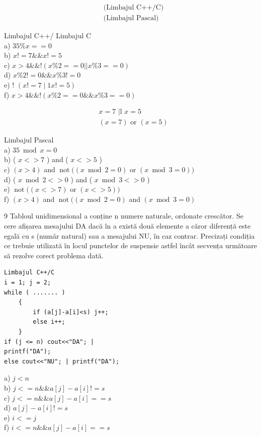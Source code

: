 \documentclass[10pt]{article}
\begin{document}
$$
\begin{aligned}
& \text { (Limbajul C++/C) } \\
& \text { (Limbajul Pascal) }
\end{aligned}
$$

Limbajul C++/ Limbajul C\\
a) $35 \% x==0$\\
b) $x!=7 \& \& x!=5$\\
c) $x>4 \& \&!(x \% 2==0| | x \% 3==0)$\\
d) $x \% 2!=0 \& \& x \% 3!=0$\\
e) ! $(x!=7 \mid 1 x!=5)$\\
f) $x>4 \& \&!(x \% 2==0 \& \& x \% 3==0)$

$$
\begin{aligned}
& x=7 \text { |l } x=5 \\
& (x=7) \text { or }(x=5)
\end{aligned}
$$

Limbajul Pascal\\
a) $35 \bmod x=0$\\
b) ( $x<>7$ ) and ( $x<>5$ )\\
c) $(x>4)$ and $\operatorname{not}((x \bmod 2=0)$ or $(x \bmod 3=0))$\\
d) ( $x \bmod 2<>0$ ) and ( $x \bmod 3<>0$ )\\
e) $\operatorname{not}((x<>7)$ or $(x<>5))$\\
f) $(x>4)$ and $\operatorname{not}((x \bmod 2=0)$ and $(x \bmod 3=0)$

9 Tabloul unidimensional a conține n numere naturale, ordonate crescător. Se cere afișarea mesajului DA dacă în a există două elemente a căror diferență este egală cu s (număr natural) sau a mesajului NU, în caz contrar. Precizați condiția ce trebuie utilizată în locul punctelor de suspensie astfel încât secvența următoare să rezolve corect problema dată.

\begin{verbatim}
Limbajul C++/C
i = 1; j = 2;
while ( ....... )
    {
        if (a[j]-a[i]<s) j++;
        else i++;
    }
if (j <= n) cout<<"DA"; |
printf("DA");
else cout<<"NU"; | printf("DA");
\end{verbatim}

a) $j<n$\\
b) $j<=n \& \& a[j]-a[i]!=s$\\
c) $j<=n \& \& a[j]-a[i]==s$\\
d) $a[j]-a[i]!=s$\\
e) $i<=j$\\
f) $i<=n \& \& a[j]-a[i]==s$
\end{document}
